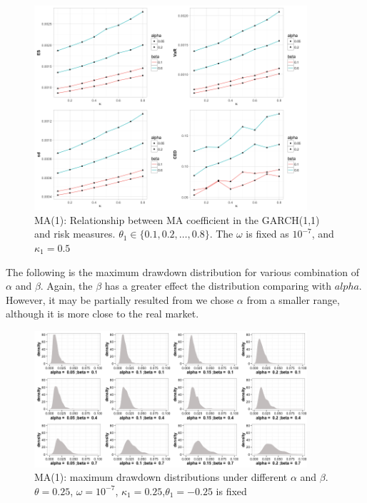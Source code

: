 \documentclass[11pt]{article}
\begin{document}
\begin{figure}[H]
\centering
\includegraphics[width = 0.9\textwidth]{../figures/simulation_garch/garch_ARMA11_risk_measures_ma1}
\caption{MA(1): Relationship between MA coefficient in the GARCH(1,1) and risk measures. $\theta_1 \in \{0.1,0.2, \dots, 0.8 \}$. The $\omega$  is fixed as $10^{-7}$, and $\kappa_1 = 0.5$}
\label{fig:garch_rm_coef_ma}
\end{figure}


The following is the maximum drawdown distribution for various combination of $\alpha$ and $\beta$. Again, the $\beta$ has a greater effect the distribution comparing with $alpha$. However, it may be partially resulted from we chose $\alpha$ from a smaller range, although it is more close to the real market.

\begin{figure}[H]
\centering
\includegraphics[width = 0.9\textwidth]{../figures/simulation_garch/garch_ARMA11_alpha_beta_3}
\caption{MA(1): maximum drawdown distributions under different $\alpha$ and $\beta$. $\theta = 0.25$, $\omega = 10^{-7}$, $\kappa_1 = 0.25$,$\theta_1 = -0.25$ is fixed }
\label{fig:garch_ma1_ddd}
\end{figure}
\end{document}
